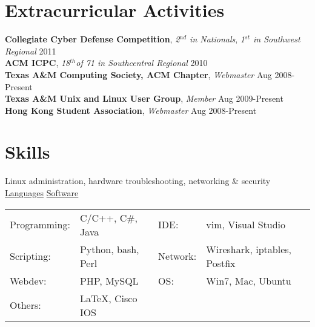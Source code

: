 \documentclass[margin,line]{res}
\newenvironment{list2}{
  \begin{list}{$\bullet$}{%
      \setlength{\itemsep}{0in}
      \setlength{\parsep}{0in} \setlength{\parskip}{0in}
      \setlength{\topsep}{0in} \setlength{\partopsep}{0in} 
      \setlength{\leftmargin}{0.18in}}}{\end{list}}
\begin{document}
\begin{resume}
%
%
\section{\sc Extracurricular Activities}
{\bf Collegiate Cyber Defense Competition}, {\em 2$^{nd}$ in Nationals}, {\em 1$^{st}$ in Southwest Regional}  \hfill 2011 \\
{\bf ACM ICPC}, {\em 18$^{th}$of 71 in Southcentral Regional} \hfill 2010 \\
{\bf Texas A\&M Computing Society, ACM Chapter}, {\em Webmaster} \hfill Aug 2008-Present \\
{\bf Texas A\&M Unix and Linux User Group}, {\em Member} \hfill Aug 2009-Present \\
{\bf Hong Kong Student Association}, {\em Webmaster} \hfill Aug 2008-Present

%
%


%
%
\section{\sc Skills} 
Linux administration, hardware troubleshooting, networking \& security \\
\underline{Languages} \hspace{2.51in} \underline{Software}\\
\begin{tabular}{@{}p{0.9in}p{2in}p{0.5in}p{4in}}
Programming:   & C/C++, C\#, Java           & IDE:        & vim, Visual Studio \\
Scripting:     & Python, bash, Perl         & Network:    & Wireshark, iptables, Postfix \\
Webdev:        & PHP, MySQL                 & OS:         & Win7, Mac, Ubuntu\\
Others:        & \LaTeX, Cisco IOS          & &
\end{tabular}



\end{resume}
\end{document}
